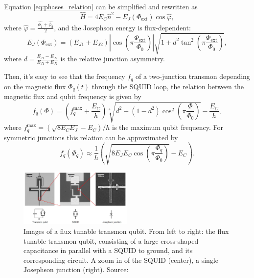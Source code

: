 Equation \ref{eq:phases_relation} can be simplified and rewritten as 
\begin{equation}\label{eq:tunable_transmon_hamiltonian}
    \hat{H} = 4E_C\hat{n}^2 - E_J(\Phi_{\text{ext}})\cos{\hat{\varphi}},
\end{equation}
where $\hat{\varphi} = \frac{\hat{\phi_1}+\hat{\phi_2}}{2}$, and the Josephson energy is flux-dependent: 
\begin{equation}\label{eq:EJ_tunable}
    E_J(\Phi_{\text{ext}}) = (E_{J1} + E_{J2}) \left| \cos \left( \pi \frac{\Phi_{\text{ext}}}{\Phi_0} \right) \right| \sqrt{1 + d^2 \tan^2 \left( \pi \frac{\Phi_{\text{ext}}}{\Phi_0} \right) },
\end{equation}
where $d = \frac{E_{J1}-E_{J2}}{E_{J1}+E_{J2}}$ is the relative junction asymmetry.

Then, it's easy to see that the frequency $f_q$ of a two-junction transmon depending on the magnetic flux $\Phi_q(t)$ through the SQUID loop, the relation between the magnetic flux and qubit frequency is given by \cite{PhysRevApplied.20.024070}
\begin{equation}\label{eq:freqdepndenceonflux}
    f_q(\Phi) = \left( f_q^{\text{max}} + \frac{E_C}{h} \right) \sqrt[4]{d^2 + (1 - d^2) \cos^2 \left( \pi \frac{\Phi}{\Phi_0} \right)} - \frac{E_C}{h},
\end{equation}
where $f_q^{\text{max}} = (\sqrt{8E_C E_J}-E_C)/h$ is the maximum qubit frequency. For symmetric junctions this relation can be approximated by \cite{rol_time-domain_2020}
\begin{equation}\label{eq:freqdepndenceonflux_approx}
    f_q(\Phi_q) \approx \frac{1}{h} \left( \sqrt{8E_J E_C \cos\left(\pi \frac{\Phi_q}{\Phi_0} \right)} - E_C \right).
\end{equation}

\begin{figure}[ht!]
    \centering
    \includegraphics[width=0.50\textwidth]{figures/png/FrequencyTunableTransmon.png}
    \caption{Images of a flux tunable transmon qubit. From left to right: the flux tunable transmon qubit, consisting of a large cross-shaped capacitance in parallel with a SQUID to ground, and its corresponding circuit. A zoom in of the SQUID (center), a single Josephson junction (right). Source: \cite{Roth_2023}}
    \label{fig:FrequencyTunableTransmon}
\end{figure}

